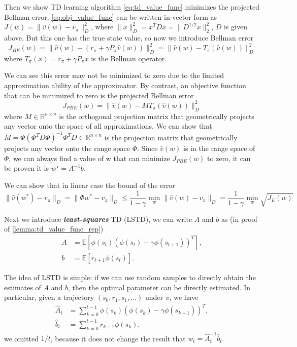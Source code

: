 \documentclass[10pt]{elegantbook}
\newcommand{\mydefination}[1]{\textbf{\textit{\textcolor{structurecolor}{#1}}}}
\begin{document}
Then we show TD learning algorithm \ref{eq:td_value_func} minimizes the projected Bellman error. 
\ref{eq:obj_value_func} can be written in vector form as $J(w) = \| \hat v(w) - v_{\pi} \|_D^2$, where $\| x \|_D^2 = x^T D x = \| D^{1/2}x \|_2^2$, $D$ is 
given above. But this one has the true state value, so now we introduce Bellman error
\begin{equation} \label{eq:Bellman_error}
    J_{BE}(w) = \| \hat v(w) - (r_{\pi} + \gamma P_{\pi} \hat v(w)) \|_D^2 = \| \hat v(w) - T_{\pi} (\hat v(w)) \|_D^2
\end{equation}
where $T_{\pi}(x) = r_{\pi} + \gamma P_{\pi} x$ is the Bellman operator.

We can see this error may not be minimized to zero due to the limited approximation ability of the approximator. By contrast, an objective function
that can be minimized to zero is the projected Bellman error
\begin{equation} \label{eq:projected_Bellman_error}
    J_{PBE}(w) = \| \hat v(w) - MT_{\pi} (\hat v(w)) \|_D^2
\end{equation}
where $M \in \mathbb R^{n \times n}$ is the orthogonal projection matrix that geometrically projects any vector onto the space of all approximations.
We can show that $M=\Phi(\Phi^{T}D\Phi)^{-1}\Phi^{T}D\in\mathbb{R}^{n\times n}$ is the projection matrix that geometrically projects any vector onto 
the range space $\Phi$. Since $\hat v(w)$ is in the range space of $\Phi$, we can always find a value of w that can minimize
$J_{PBE}(w)$ to zero, it can be proven it is $w^{\star}=A^{-1}b$.

We can show that in linear case the bound of the error
\[ \|{\hat{v}}(w^{*})-v_{\pi}\|_{D}=
\|\Phi w^{*}-v_{\pi}\|_{D}\leq{\frac{1}{1-\gamma}}\operatorname*{min}_{w}\|{\hat{v}}(w)-v_{\pi}\|_{D}=
{\frac{1}{1-\gamma}}\operatorname*{min}_{w}\sqrt{J_{E}(w)} \]

Next we introduce \mydefination{least-squares} TD (LSTD), we can write $A$ and $b$ as (in proof of \ref{lemma:td_value_func_rep})
\begin{align*}
    A &= \mathbb{E}\left[\phi(s_{t})\left(\phi(s_{t})-\gamma\phi(s_{t+1})\right)^{T}\right], \\ 
    b &= \mathbb{E}\left[r_{t+1}\phi(s_{t})\right].
\end{align*}

The idea of LSTD is simple: if we can use random samples to directly obtain the estimates of $A$ and $b$, then the optimal parameter can be directly estimated.
In particular, given a trajectory $(s_0, r_1, s_1, \ldots)$ under $\pi$, we have
\begin{align}
    \hat{A}_{t} &= \sum_{k=0}^{t-1}\phi(s_{k})\left(\phi(s_{k})-\gamma\phi(s_{k+1})\right)^{T}, \\ 
    \hat{b}_{t} &= \sum_{k=0}^{t-1}r_{k+1}\phi(s_{k}).
\end{align}
we omitted $1 / t$, because it does not change the result that $w_{t}=\hat{A}_{t}^{-1}\hat{b}_{t}$.
\end{document}
